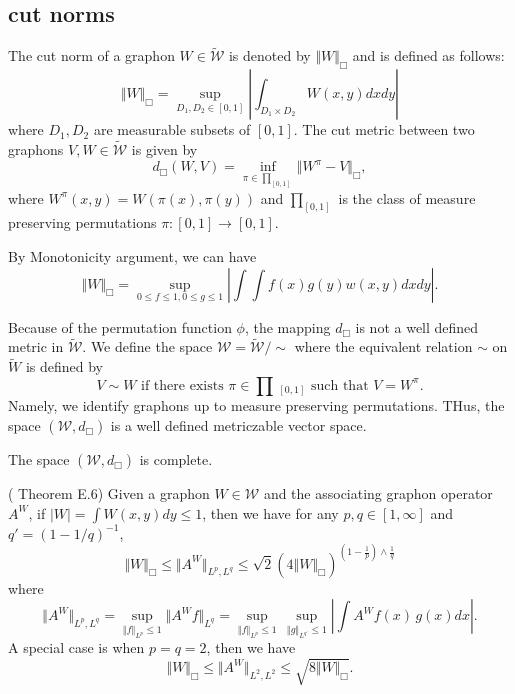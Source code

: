 \subsection{cut norms}

\begin{definition}
	The cut norm of a graphon $W \in \tilde{\mathcal{W}}$ is denoted by $\Vert W \Vert_{\Box}$ and is defined as follows:
	\begin{equation}
	\Vert W \Vert_{\Box} = \sup_{D_1, D_2 \in [0,1]} \left\vert \int_{D_1 \times D_2} W(x,y) dx dy\right\vert
	\end{equation}
	where $D_1, D_2$ are measurable subsets of $[0,1]$. The cut metric between two graphons $V,W \in \tilde{\mathcal{W}}$ is given by
	$$
	d_\Box(W,V) = \inf_{\pi \in \prod_{[0,1]} } \Vert W^{\pi} - V \Vert_{\Box},
	$$
	where $W^{\pi}(x,y) = W(\pi(x), \pi(y))$ and $\prod_{[0,1]}$ is the class of measure preserving permutations $\pi: [0,1] \to [0,1]$.
\end{definition}

\begin{remark}
	By Monotonicity argument, we can have
	$$
	\Vert W \Vert_{\Box} = \sup_{0 \leq f \leq 1, 0 \leq g \leq 1} \left\vert \int \int f(x)g(y) w(x,y) dx dy \right\vert.
	$$
\end{remark}

Because of the permutation function $\phi$, the mapping $d_\Box$ is not a well defined metric in $\tilde{\mathcal{W}}$. We define the space $\mathcal{W} = \tilde{\mathcal{W}} / \sim$
where the equivalent relation $\sim$ on $\tilde{W}$ is defined by
$$
V \sim W \text{ if there exists } \pi \in \prod\,_{[0,1]} \text{   such that } V = W^{\pi}.
$$
Namely, we identify graphons up to measure preserving permutations. THus, the space $(\mathcal{W}, d_\Box)$ is a well defined metriczable vector space.

\begin{proposition}
	The space $(\mathcal{W}, d_\Box)$ is complete.
\end{proposition}

\begin{lemma} (\cite{janson2010graphons} Theorem E.6)
	Given a graphon $W \in \mathcal{W}$ and the associating graphon operator $A^W$, if $|W| = \int W(x,y) dy \leq 1$, then we have for any $p,q \in [1,\infty]$ and $q' = (1- 1/q)^{-1}$,
	$$
	\Vert W \Vert_{\Box} \leq \Vert A^W \Vert_{L^p, L^q} \leq \sqrt{2} (4 \Vert W \Vert_{\Box})^{(1-\frac{1}{p}) \wedge \frac{1}{q}}
	$$
	where
	$$ \Vert A^W \Vert_{L^p, L^q} =  \sup_{ \Vert f\Vert_{L^p} \leq 1} \Vert A^W f \Vert_{L^q} = \sup_{ \Vert f \Vert_{L^p} \leq 1}\, \sup_{ \Vert g \Vert_{L^{q'}}  \leq 1} \left\vert \int A^W f(x) \, g(x) dx \right\vert.
	$$	
	A special case is when $p=q=2$, then we have
	$$
	\Vert W \Vert_{\Box} \leq \Vert A^W \Vert_{L^2, L^2} \leq \sqrt{8 \Vert W \Vert_{\Box}}.
	$$	
	\label{lemma:cut_norm_ineq}
\end{lemma}


